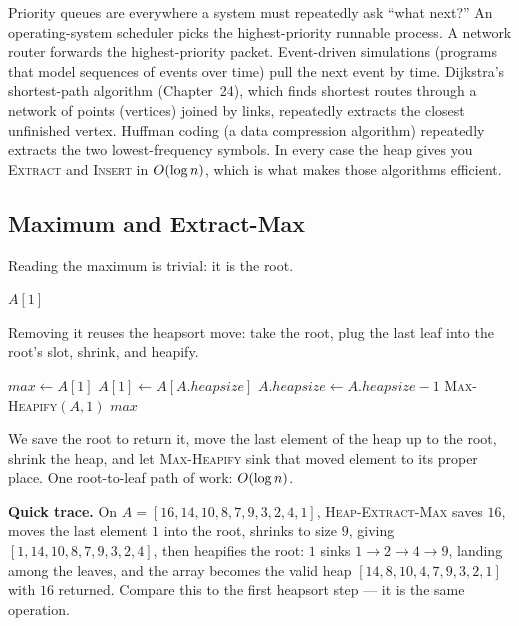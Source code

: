 \begin{aestheticbox}
Priority queues are everywhere a system must repeatedly ask ``what next?'' An
operating-system scheduler picks the highest-priority runnable process. A
network router forwards the highest-priority packet. Event-driven simulations (programs that model sequences of events over time) pull
the next event by time. Dijkstra's shortest-path algorithm (Chapter~24), which
finds shortest routes through a network of points (vertices) joined by links,
repeatedly extracts the closest unfinished vertex. Huffman coding (a data compression algorithm) repeatedly extracts the two
lowest-frequency symbols. In every case the heap gives you \textsc{Extract} and
\textsc{Insert} in $O(\log n)$, which is what makes those algorithms efficient.
\end{aestheticbox}

\subsection{Maximum and Extract-Max}

Reading the maximum is trivial: it is the root.

\begin{algorithm}[H]
\caption{\textsc{Heap-Maximum}$(A)$}
\Return $A[1]$\;
\end{algorithm}

Removing it reuses the heapsort move: take the root, plug the last leaf into the
root's slot, shrink, and heapify.

\begin{algorithm}[H]
\caption{\textsc{Heap-Extract-Max}$(A)$}
$\mathit{max} \leftarrow A[1]$\;
$A[1] \leftarrow A[A.\mathit{heapsize}]$\;
$A.\mathit{heapsize} \leftarrow A.\mathit{heapsize} - 1$\;
\textsc{Max-Heapify}$(A, 1)$\;
\Return $\mathit{max}$\;
\end{algorithm}

We save the root to return it, move the last element of the heap up to the root,
shrink the heap, and let \textsc{Max-Heapify} sink that moved element to its
proper place. One root-to-leaf path of work: $O(\log n)$.

\textbf{Quick trace.} On $A=[16,14,10,8,7,9,3,2,4,1]$, \textsc{Heap-Extract-Max}
saves $16$, moves the last element $1$ into the root, shrinks to size $9$, giving
$[1,14,10,8,7,9,3,2,4]$, then heapifies the root: $1$ sinks $1\to 2\to 4\to 9$,
landing among the leaves, and the array becomes the valid heap
$[14,8,10,4,7,9,3,2,1]$ with $16$ returned. Compare this to the first heapsort
step --- it is the same operation.

